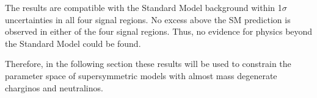 The results are compatible with the Standard Model background within 1$\sigma$ uncertainties in all four signal regions.
No excess above the SM prediction is observed in either of the four signal regions.
Thus, no evidence for physics beyond the Standard Model could be found.

Therefore, in the following section these results will be used to constrain the parameter space of supersymmetric models with almost mass degenerate charginos and neutralinos.






